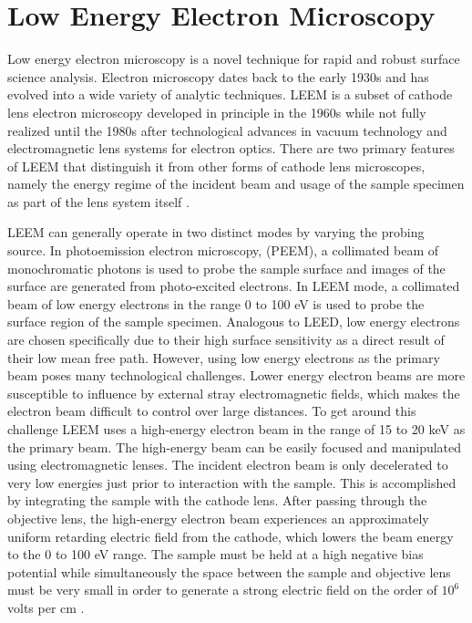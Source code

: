 \section{Low Energy Electron Microscopy}
Low energy electron microscopy is a novel technique for rapid and robust surface science analysis. Electron microscopy dates back to the early 1930s and has evolved into a wide variety of analytic techniques. LEEM is a subset of cathode lens electron microscopy developed in principle in the 1960s while not fully realized until the 1980s after technological advances in vacuum technology and electromagnetic lens systems for electron optics. There are two primary features of LEEM that distinguish it from other forms of cathode lens microscopes, namely the energy regime of the incident beam and usage of the sample specimen as part of the lens system itself \cite{Hannon-LEEM-Book}.

LEEM can generally operate in two distinct modes by varying the probing source. In photoemission electron microscopy, (PEEM), a collimated beam of monochromatic photons is used to probe the sample surface and images of the surface are generated from photo-excited electrons. In LEEM mode, a collimated beam of low energy electrons in the range 0 to 100 eV is used to probe the surface region of the sample specimen. Analogous to LEED, low energy electrons are chosen specifically due to their high surface sensitivity as a direct result of their low mean free path. However, using low energy electrons as the primary beam poses many technological challenges. 
Lower energy electron beams are more susceptible to influence by external stray electromagnetic fields, which makes the electron beam difficult to control over large distances. To get around this challenge LEEM uses a high-energy electron beam in the range of 15 to 20 keV as the primary beam. The high-energy beam can be easily focused and manipulated using electromagnetic lenses.  The incident electron beam is only decelerated to very low energies just prior to interaction with the sample. This is accomplished by integrating the sample with the cathode lens. After passing through the objective lens, the high-energy electron beam experiences an approximately uniform retarding electric field from the cathode, which lowers the beam energy to the 0 to 100 eV range. The sample must be held at a high negative bias potential while simultaneously the space between the sample and objective lens must be very small in order to generate a strong electric field on the order of $10^6$ volts per cm \cite{Hannon-LEEM-Book}.


